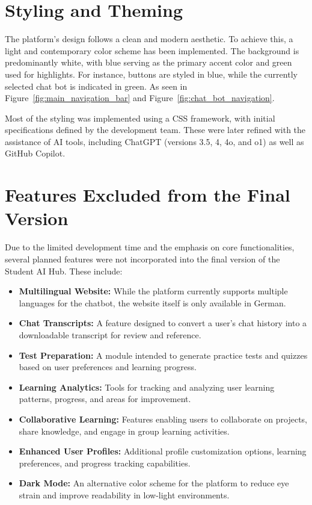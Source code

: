 \section{Styling and Theming}

The platform's design follows a clean and modern aesthetic. 
To achieve this, a light and contemporary color scheme has been implemented. The background is predominantly white, 
with blue serving as the primary accent color and green used for highlights. 
For instance, buttons are styled in blue, while the currently selected chat bot is indicated in green. As seen in
Figure~\ref{fig:main_navigation_bar} and Figure~\ref{fig:chat_bot_navigation}.

Most of the styling was implemented using a CSS framework, with initial specifications defined by the development team. These were later refined with the assistance of AI tools, including ChatGPT (versions 3.5, 4, 4o, and o1) as well as GitHub Copilot.

\section{Features Excluded from the Final Version}

Due to the limited development time and the emphasis on core functionalities, several planned features were not incorporated into the final version of the Student AI Hub. These include:

\begin{itemize}
\item \textbf{Multilingual Website:} While the platform currently supports multiple languages for the chatbot, the website itself is only available in German.
\item \textbf{Chat Transcripts:} A feature designed to convert a user's chat history into a downloadable transcript for review and reference.
\item \textbf{Test Preparation:} A module intended to generate practice tests and quizzes based on user preferences and learning progress.
\item \textbf{Learning Analytics:} Tools for tracking and analyzing user learning patterns, progress, and areas for improvement.
\item \textbf{Collaborative Learning:} Features enabling users to collaborate on projects, share knowledge, and engage in group learning activities.
\item \textbf{Enhanced User Profiles:} Additional profile customization options, learning preferences, and progress tracking capabilities.
\item \textbf{Dark Mode:} An alternative color scheme for the platform to reduce eye strain and improve readability in low-light environments.
\end{itemize}

